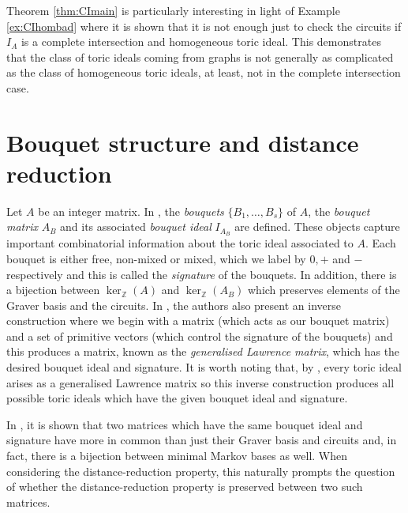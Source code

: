 \documentclass[a4paper, 12pt]{article}
\newcommand{\ZZ}{\mathbb Z}
\theoremstyle{plain}
\theoremstyle{definition}
\theoremstyle{remark}
\begin{document}
    
    


Theorem \ref{thm:CImain} is particularly interesting in light of Example \ref{ex:CIhombad} where it is shown that it is not enough just to check the circuits if $I_A$ is a complete intersection and homogeneous toric ideal. This demonstrates that the class of toric ideals coming from graphs is not generally as complicated as the class of homogeneous toric ideals, at least, not in the complete intersection case.



\section{Bouquet structure and distance reduction} \label{sec:Bouquets}

Let $A$ be an integer matrix. In \cite{petrovic2018bouquet}, the \textit{bouquets} $\{B_1, \dots, B_s\}$ of $A$, the \textit{bouquet matrix} $A_B$ and its associated \textit{bouquet ideal} $I_{A_B}$ are defined. These objects capture important combinatorial information about the toric ideal associated to $A$. Each bouquet is either free, non-mixed or mixed, which we label by $0,+$ and $-$ respectively and this is called the \textit{signature} of the bouquets. In addition, there is a bijection between $\ker_{\ZZ}(A)$ and $\ker_{\ZZ}(A_B)$ which preserves elements of the Graver basis and the circuits. In \cite{petrovic2018bouquet}, the authors also present an inverse construction where we begin with a matrix (which acts as our bouquet matrix) and a set of primitive vectors (which control the signature of the bouquets) and this produces a matrix, known as the \textit{generalised Lawrence matrix}, which has the desired bouquet ideal and signature. It is worth noting that, by \cite[Corollary~2.3]{petrovic2018bouquet}, every toric ideal arises as a generalised Lawrence matrix so this inverse construction produces all possible toric ideals which have the given bouquet ideal and signature.

In \cite{kosta2023strongly}, it is shown that two matrices which have the same bouquet ideal and signature have more in common than just their Graver basis and circuits and, in fact, there is a bijection between minimal Markov bases as well. When considering the distance-reduction property, this naturally prompts the question of whether the distance-reduction property is preserved between two such matrices.
\end{document}
